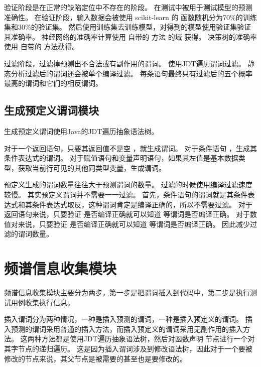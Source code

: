 验证阶段是在正常的缺陷定位中不存在的阶段。
在测试中被用于测试模型的预测准确性。
在验证阶段，输入数据会被使用 scikit-learn 的  函数随机分为70\%的训练集和30\%的验证集。
然后使用训练集去训练模型，对得到的模型使用验证集验证其准确率。
神经网络的准确率计算使用  自带的  方法
的域  获得。
决策树的准确率使用  自带的  方法获得。

过滤阶段，过滤掉预测出不合法或有副作用的谓词。
使用JDT遍历谓词过滤。
静态分析过滤后的谓词还会被单个编译过滤。
每条语句最终只有过滤后的五个概率最高的谓词和它们的相反谓词。

\subsection{生成预定义谓词模块}

生成预定义谓词使用Java的JDT遍历抽象语法树。

对于一个返回语句，只要其返回值不是空 ，就生成谓词。
对于条件语句 ，生成其条件表达式的谓词。
对于赋值语句和变量声明语句，如果其左值是基本数据类型，获取当前行可见的其他同类型变量，生成谓词。

预定义生成的谓词数量往往大于预测谓词的数量。
过滤的时候使用编译过滤速度较慢。
其实预定义谓词并不需要一一过滤。
首先，条件语句的谓词就是其条件表达式和其条件表达式取反，这种谓词肯定是编译正确的，所以不需要过滤。
对于返回语句来说，只要验证  是否编译正确就可以知道  等谓词是否编译正确。
对于数值对来说，只要验证  是否编译正确就可以知道  等谓词是否编译正确。
因此减少过滤的谓词数量。

\section{频谱信息收集模块} 

频谱信息收集模块主要分为两步，第一步是把谓词插入到代码中，第二步是执行测试用例收集执行信息。

插入谓词分为两种情况，一种是插入预测的谓词，一种是插入预定义的谓词。
插入预测的谓词采用普通的插入方法，而插入预定义的谓词采用无副作用的插入方法。
这两种方法都是使用JDT遍历抽象语法树，然后对函数声明  节点进行一个对其字节点的递归遍历。
这是因为插入谓词涉及到修改语法树，因此对于一个要被修改的节点来说，其父节点是被需要的甚至也是要修改的。

